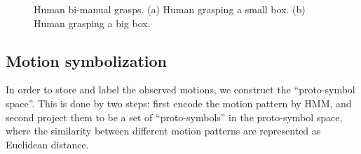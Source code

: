 \begin{figure}
\centering
  \caption{ \scriptsize{Human bi-manual grasps. (a) Human grasping a small box. (b) Human grasping a big box.}}
  \label{fig:bimanual}
\end{figure}


\subsection{Motion symbolization}
\label{cha5:sec2:symbolization}
In order to store and label the observed motions, we construct the ``proto-symbol space''. This is done by two steps: first encode the motion pattern by HMM, and second project them to be a set of ``proto-symbols'' in the proto-symbol space, where the similarity between different motion patterns are represented as Euclidean distance.

